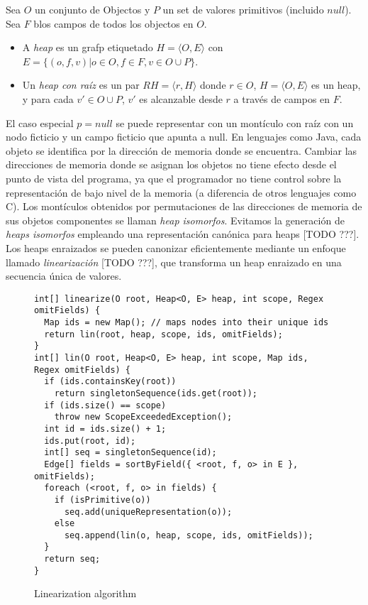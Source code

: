 \begin{definition}
    Sea $O$ un conjunto de Objectos y $P$ un set de valores primitivos (incluido $null$). Sea $F$ blos campos de todos los objectos en $O$. 
    \begin{itemize}
        \item A \emph{heap} es un grafp etiquetado $H = \langle O,E\rangle$ con $E = \{(o,f,v) | o \in O, f \in F, v \in O \cup P\}$.
        \item Un \emph{heap con raíz} es un par $RH = \langle r, H\rangle$ donde
            $r \in O$, $H = \langle O,E\rangle$ es un heap, y para cada $v' \in O \cup P$, $v'$ es alcanzable desde $r$ a través de campos en $F$.
    \end{itemize}
\end{definition}

El caso especial $p=null$  se puede representar con un montículo con raíz con un nodo ficticio y un campo ficticio que apunta a null. En lenguajes como Java, cada objeto se identifica por la dirección de memoria donde se encuentra. Cambiar las direcciones de memoria donde se asignan los objetos no tiene efecto desde el punto de vista del programa, ya que el programador no tiene control sobre la representación de bajo nivel de la memoria (a diferencia de otros lenguajes como C). Los montículos obtenidos por permutaciones de las direcciones de memoria de sus objetos componentes se llaman \emph{heap isomorfos}. Evitamos la generación de \emph{heaps isomorfos} empleando una representación canónica para heaps [TODO ???]. Los heaps enraizados se pueden canonizar eficientemente mediante un enfoque llamado \emph{linearización} [TODO ???], que transforma un heap enraizado en una secuencia única de valores. 


\begin{figure}[!th]
\begin{lstlisting}
int[] linearize(O root, Heap<O, E> heap, int scope, Regex omitFields) {
  Map ids = new Map(); // maps nodes into their unique ids 
  return lin(root, heap, scope, ids, omitFields); 
}
int[] lin(O root, Heap<O, E> heap, int scope, Map ids, Regex omitFields) { 
  if (ids.containsKey(root))
    return singletonSequence(ids.get(root)); 
  if (ids.size() == scope) 
    throw new ScopeExceededException();
  int id = ids.size() + 1;
  ids.put(root, id);
  int[] seq = singletonSequence(id);
  Edge[] fields = sortByField({ <root, f, o> in E }, omitFields); 
  foreach (<root, f, o> in fields) {
    if (isPrimitive(o)) 
      seq.add(uniqueRepresentation(o));
    else
      seq.append(lin(o, heap, scope, ids, omitFields));
  }
  return seq; 
}
\end{lstlisting}
\caption{Linearization algorithm}
\label{alg:linearization}
\end{figure}


